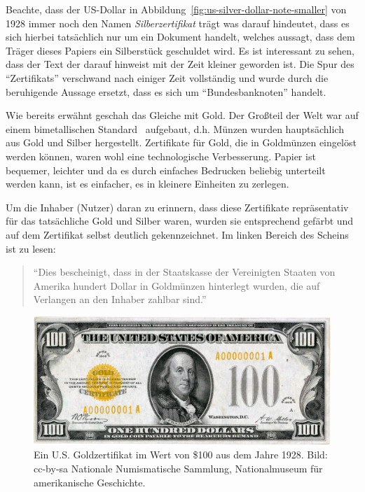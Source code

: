 Beachte, dass der US-Dollar in Abbildung~\ref{fig:us-silver-dollar-note-smaller}
von 1928 immer noch den Namen \textit{Silberzertifikat} trägt was darauf
hindeutet, dass es sich hierbei tatsächlich nur um ein Dokument handelt, welches
aussagt, dass dem Träger dieses Papiers ein Silberstück geschuldet wird. Es ist
interessant zu sehen, dass der Text der darauf hinweist mit der Zeit kleiner
geworden ist. Die Spur des \enquote{Zertifikats} verschwand nach einiger Zeit
vollständig und wurde durch die beruhigende Aussage ersetzt, dass es sich um
\enquote{Bundesbanknoten} handelt.

Wie bereits erwähnt geschah das Gleiche mit Gold. Der Großteil der Welt war auf
einem bimetallischen Standard~\cite{wiki:bimetallism} aufgebaut, d.h. Münzen
wurden hauptsächlich aus Gold und Silber hergestellt. Zertifikate für Gold, die
in Goldmünzen eingelöst werden können, waren wohl eine technologische
Verbesserung. Papier ist bequemer, leichter und da es durch einfaches Bedrucken
beliebig unterteilt werden kann, ist es einfacher, es in kleinere Einheiten zu
zerlegen.

Um die Inhaber (Nutzer) daran zu erinnern, dass diese Zertifikate repräsentativ
für das tatsächliche Gold und Silber waren, wurden sie entsprechend gefärbt und
auf dem Zertifikat selbst deutlich gekennzeichnet. Im linken Bereich des Scheins
ist zu lesen:

\begin{quotation}\begin{samepage}
\enquote{Dies bescheinigt, dass in der Staatskasse der Vereinigten Staaten von
Amerika hundert Dollar in Goldmünzen hinterlegt wurden, die auf Verlangen an den
Inhaber zahlbar sind.}
\end{samepage}\end{quotation}

\begin{figure}
  \centering
  \includegraphics{assets/images/us-gold-cert-100-smaller.png}
  \caption{Ein U.S. Goldzertifikat im Wert von \$100 aus dem Jahre 1928. Bild:
  cc-by-sa Nationale Numismatische Sammlung, Nationalmuseum für amerikanische
  Geschichte.}
  \label{fig:us-gold-cert-100-smaller}
\end{figure}

